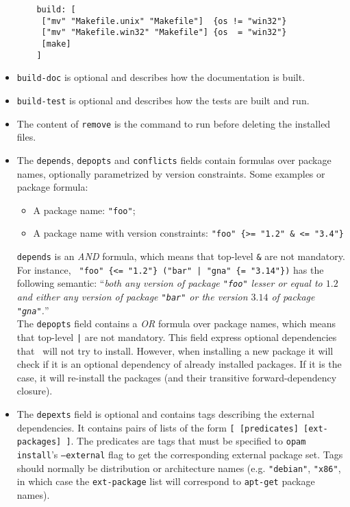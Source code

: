 \documentclass[a4paper,10pt]{article}
\begin{document}
\begin{itemize}
  \begin{Verbatim}
    build: [
     ["mv" "Makefile.unix" "Makefile"]  {os != "win32"}
     ["mv" "Makefile.win32" "Makefile"] {os  = "win32"}
     [make]
    ]
  \end{Verbatim}

\item {\tt build-doc} is optional and describes how the documentation
  is built.

\item {\tt build-test} is optional and describes how the tests are
  built and run.

\item The content of {\tt remove} is the command to run before deleting
  the installed files.

\item The {\tt depends}, {\tt depopts} and {\tt conflicts} fields
  contain formulas over package names, optionally parametrized by
  version constraints. Some examples or package formula:

\begin{itemize}
\item A package name: {\tt "foo"};
\item A package name with version constraints:
  \verb+"foo" {>= "1.2" & <= "3.4"}+
\end{itemize}

{\tt depends} is an {\em AND} formula, which means that top-level
\verb+&+ are not mandatory. For instance,
 \verb+ "foo" {<= "1.2"} ("bar" | "gna" {= "3.14"})+ has the following
 semantic:  ``{\em both any version of package
  {\tt "foo"} lesser or equal to $1.2$ and either any version of package
  {\tt "bar"} or the version $3.14$ of package {\tt "gna"}.}''  \\

The {\tt depopts} field contains a {\em OR} formula over
  package names, which means that top-level \verb+|+ are not
  mandatory. This field express optional dependencies that
  \OPAM\ will not try to install. However, when installing a new
  package it will check if it is an optional dependency of already
  installed packages. If it is the case, it will re-install the
  packages (and their transitive forward-dependency closure).

\item The {\tt depexts} field is optional and contains tags describing the
  external dependencies. It contains pairs of lists of the form
  \verb+[ [predicates] [ext-packages] ]+. The predicates are tags that must be
  specified to {\tt opam install}'s {\tt --external} flag to get the
  corresponding external package set. Tags should normally be distribution or
  architecture names (e.g. \verb+"debian"+, \verb+"x86"+, in which case the
  \verb+ext-package+ list will correspond to {\tt apt-get} package names).


\end{itemize}
\end{document}
